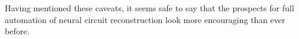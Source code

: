 \documentclass{article}
\begin{document}
Having mentioned these caveats, it seems safe to say that the prospects for full
automation of neural circuit reconstruction look more encouraging than ever
before.






\end{document}
